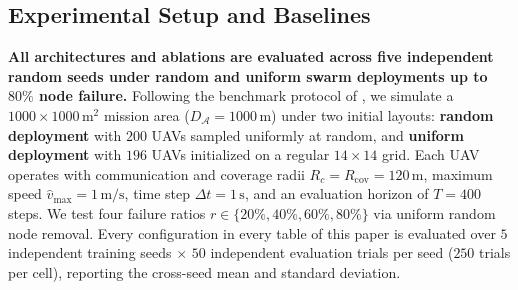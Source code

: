 \documentclass[11pt]{article}
\theoremstyle{plain}
\theoremstyle{definition}
\theoremstyle{remark}
\begin{document}
\subsection{Experimental Setup and Baselines}
\label{sec:baselines-r2c}
\textbf{All architectures and ablations are evaluated across five independent random seeds under random and uniform swarm deployments up to $80\%$ node failure.} Following the benchmark protocol of \citet{peng2026r2c}, we simulate a $1000 \times 1000\,\mathrm{m}^2$ mission area ($D_{\mathcal{A}} = 1000\,\mathrm{m}$) under two initial layouts: \textbf{random deployment} with $200$ UAVs sampled uniformly at random, and \textbf{uniform deployment} with $196$ UAVs initialized on a regular $14 \times 14$ grid. Each UAV operates with communication and coverage radii $R_c = R_{\mathrm{cov}} = 120\,\mathrm{m}$, maximum speed $\hat{v}_{\max} = 1\,\mathrm{m/s}$, time step $\Delta t = 1\,\mathrm{s}$, and an evaluation horizon of $T = 400$ steps. We test four failure ratios $r \in \{20\%, 40\%, 60\%, 80\%\}$ via uniform random node removal. Every configuration in every table of this paper is evaluated over $5$ independent training seeds $\times$ $50$ independent evaluation trials per seed ($250$ trials per cell), reporting the cross-seed mean and standard deviation.
\end{document}
